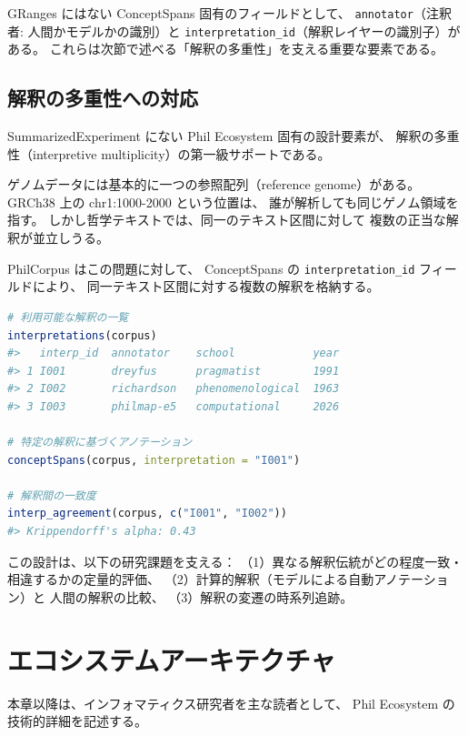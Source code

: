 \documentclass[a4paper,11pt]{ltjsarticle}
\begin{document}
GRanges にはない ConceptSpans 固有のフィールドとして、
\texttt{annotator}（注釈者: 人間かモデルかの識別）と
\texttt{interpretation\_id}（解釈レイヤーの識別子）がある。
これらは次節で述べる「解釈の多重性」を支える重要な要素である。

\subsection{解釈の多重性への対応}

SummarizedExperiment にない Phil Ecosystem 固有の設計要素が、
解釈の多重性（interpretive multiplicity）の第一級サポートである。

ゲノムデータには基本的に一つの参照配列（reference genome）がある。
GRCh38 上の chr1:1000-2000 という位置は、
誰が解析しても同じゲノム領域を指す。
しかし哲学テキストでは、同一のテキスト区間に対して
複数の正当な解釈が並立しうる。

PhilCorpus はこの問題に対して、
ConceptSpans の \texttt{interpretation\_id} フィールドにより、
同一テキスト区間に対する複数の解釈を格納する。

\begin{lstlisting}[language=R,caption=解釈の多重性の操作]
# 利用可能な解釈の一覧
interpretations(corpus)
#>   interp_id  annotator    school            year
#> 1 I001       dreyfus      pragmatist        1991
#> 2 I002       richardson   phenomenological  1963
#> 3 I003       philmap-e5   computational     2026

# 特定の解釈に基づくアノテーション
conceptSpans(corpus, interpretation = "I001")

# 解釈間の一致度
interp_agreement(corpus, c("I001", "I002"))
#> Krippendorff's alpha: 0.43
\end{lstlisting}

この設計は、以下の研究課題を支える：
（1）異なる解釈伝統がどの程度一致・相違するかの定量的評価、
（2）計算的解釈（モデルによる自動アノテーション）と
人間の解釈の比較、
（3）解釈の変遷の時系列追跡。


\section{エコシステムアーキテクチャ}\label{sec:architecture}

本章以降は、インフォマティクス研究者を主な読者として、
Phil Ecosystem の技術的詳細を記述する。
\end{document}
